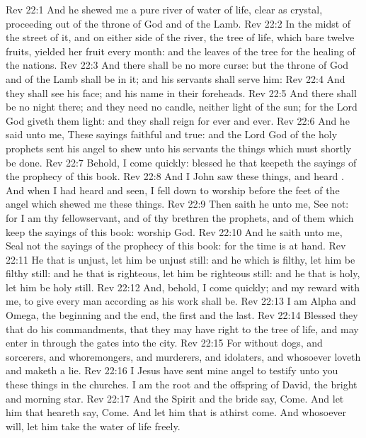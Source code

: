 \vs Rev 22:1 And he shewed me a pure river of water of life, clear as crystal, proceeding out of the throne of God and of the Lamb.
\vs Rev 22:2 In the midst of the street of it, and on either side of the river,  the tree of life, which bare twelve  fruits,  yielded her fruit every month: and the leaves of the tree  for the healing of the nations.
\vs Rev 22:3 And there shall be no more curse: but the throne of God and of the Lamb shall be in it; and his servants shall serve him:
\vs Rev 22:4 And they shall see his face; and his name  in their foreheads.
\vs Rev 22:5 And there shall be no night there; and they need no candle, neither light of the sun; for the Lord God giveth them light: and they shall reign for ever and ever.
\vs Rev 22:6 And he said unto me, These sayings  faithful and true: and the Lord God of the holy prophets sent his angel to shew unto his servants the things which must shortly be done.
\vs Rev 22:7 Behold, I come quickly: blessed  he that keepeth the sayings of the prophecy of this book.
\vs Rev 22:8 And I John saw these things, and heard . And when I had heard and seen, I fell down to worship before the feet of the angel which shewed me these things.
\vs Rev 22:9 Then saith he unto me, See  not: for I am thy fellowservant, and of thy brethren the prophets, and of them which keep the sayings of this book: worship God.
\vs Rev 22:10 And he saith unto me, Seal not the sayings of the prophecy of this book: for the time is at hand.
\vs Rev 22:11 He that is unjust, let him be unjust still: and he which is filthy, let him be filthy still: and he that is righteous, let him be righteous still: and he that is holy, let him be holy still.
\vs Rev 22:12 And, behold, I come quickly; and my reward  with me, to give every man according as his work shall be.
\vs Rev 22:13 I am Alpha and Omega, the beginning and the end, the first and the last.
\vs Rev 22:14 Blessed  they that do his commandments, that they may have right to the tree of life, and may enter in through the gates into the city.
\vs Rev 22:15 For without  dogs, and sorcerers, and whoremongers, and murderers, and idolaters, and whosoever loveth and maketh a lie.
\vs Rev 22:16 I Jesus have sent mine angel to testify unto you these things in the churches. I am the root and the offspring of David,  the bright and morning star.
\vs Rev 22:17 And the Spirit and the bride say, Come. And let him that heareth say, Come. And let him that is athirst come. And whosoever will, let him take the water of life freely.
